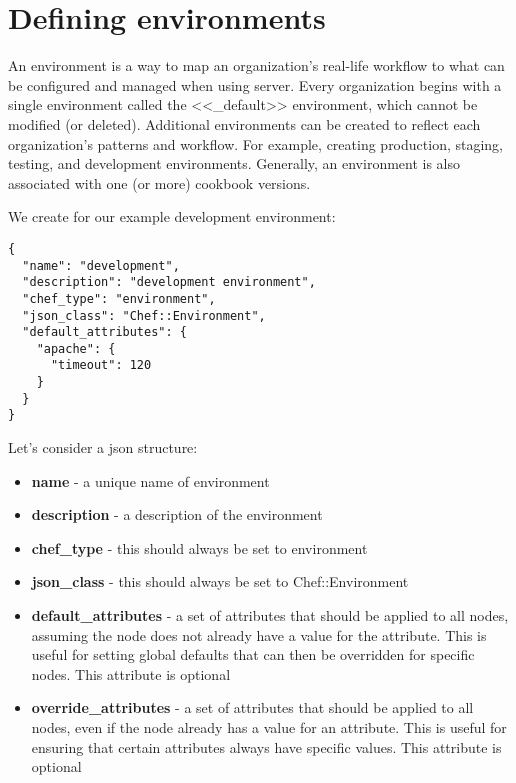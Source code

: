 \section{Defining environments}

An environment is a way to map an organization's real-life workflow to what can be configured and managed when using server. Every organization begins with a single environment called the <<\_default>> environment, which cannot be modified (or deleted). Additional environments can be created to reflect each organization's patterns and workflow. For example, creating production, staging, testing, and development environments. Generally, an environment is also associated with one (or more) cookbook versions.

We create for our example development environment:

\begin{lstlisting}[label=lst:my-cloud-chef-environment1,title=my-cloud/environments/development.json]
{
  "name": "development",
  "description": "development environment",
  "chef_type": "environment",
  "json_class": "Chef::Environment",
  "default_attributes": {
    "apache": {
      "timeout": 120
    }
  }
}
\end{lstlisting}

Let's consider a json structure:

\begin{itemize}
  \item \textbf{name} - a unique name of environment
  \item \textbf{description} - a description of the environment
  \item \textbf{chef\_type} - this should always be set to environment
  \item \textbf{json\_class} - this should always be set to Chef::Environment
  \item \textbf{default\_attributes} - a set of attributes that should be applied to all nodes, assuming the node does not already have a value for the attribute. This is useful for setting global defaults that can then be overridden for specific nodes. This attribute is optional
  \item \textbf{override\_attributes} - a set of attributes that should be applied to all nodes, even if the node already has a value for an attribute. This is useful for ensuring that certain attributes always have specific values. This attribute is optional
\end{itemize}

